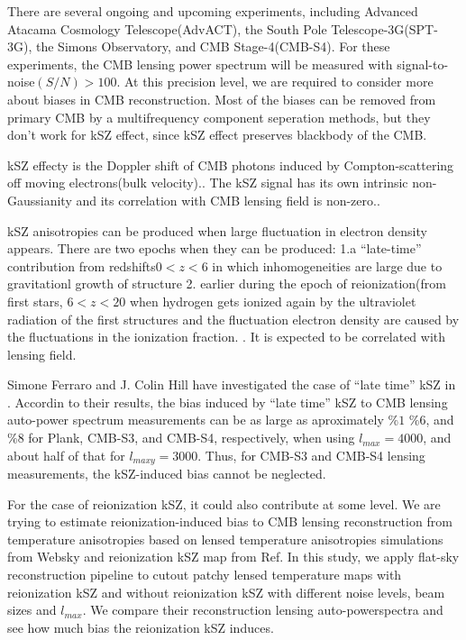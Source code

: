 \documentclass[12pt, notitlepage, onecolumn, amsmath, amssymb, aps]{revtex4-1}
\begin{document}
There are several ongoing and upcoming experiments, including Advanced Atacama Cosmology Telescope(AdvACT)\cite{Henderson:2015nzj}, the South Pole Telescope-3G(SPT-3G)\cite{Benson:2014qhw}, the Simons Observatory\cite{Ade:2018sbj}, and CMB Stage-4(CMB-S4)\cite{Abazajian:2016yjj}. For these experiments, the CMB lensing power spectrum will be measured with signal-to-noise\((S/N)>100\). At this precision level, we are required to consider more about biases in CMB reconstruction. Most of the biases can be removed from primary CMB by a multifrequency component seperation methods, but they don't work for kSZ effect, since kSZ effect preserves blackbody of the CMB.\cite{Smith:2009pn}

kSZ effecty is the Doppler shift of CMB photons induced by Compton-scattering off moving electrons(bulk velocity).\cite{Ferraro:2017fac}. The kSZ signal has its own intrinsic non-Gaussianity and its correlation with CMB lensing field is non-zero.\cite{Smith:2016lnt}.

kSZ anisotropies can be produced when large fluctuation in electron density appears. There are two epochs when they can be produced: 1.a ``late-time'' contribution from redshifts\(0<z<6\) in which inhomogeneities are large due to gravitationl growth of structure 2. earlier during the epoch of reionization(from first stars, \(6<z<20\) when hydrogen gets ionized again by the ultraviolet radiation of the first structures and the fluctuation electron density are caused by the fluctuations in the ionization fraction.\cite{Ferraro:2017fac} \cite{Alvarez:2015xzu}. It is expected to be correlated with lensing field.

Simone Ferraro and J. Colin Hill  have investigated the case of ``late time'' kSZ in \cite{Ferraro:2017fac}. Accordin to their results, the bias induced by ``late time'' kSZ to CMB lensing auto-power spectrum measurements can be as large as aproximately \(\%1\) \(\%6\), and \(\%8\) for Plank, CMB-S3, and CMB-S4, respectively, when using \(l_{max} = 4000\), and about half of that for \(l_{maxy} = 3000\). Thus, for CMB-S3 and CMB-S4 lensing measurements, the kSZ-induced bias cannot be neglected.

For the case of reionization kSZ, it could also contribute at some level. We are trying to estimate reionization-induced bias to CMB lensing reconstruction from temperature anisotropies based on lensed temperature anisotropies simulations from Websky\cite{Stein:2020its} and reionization kSZ map from Ref\cite{Alvarez:2015xzu}. In this study, we apply flat-sky reconstruction pipeline to cutout patchy lensed temperature maps with reionization kSZ and without reionization kSZ with different noise levels, beam sizes and \(l_{max}\). We compare their reconstruction lensing auto-powerspectra and see how much bias the reionization kSZ induces.
\end{document}
